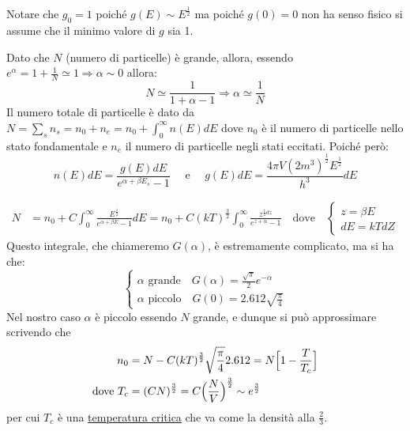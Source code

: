 Notare che $g_0 = 1$ poiché $g(E) \sim E^{ \frac{ 1}{2 }}$ ma poiché $g(0)=0$ non ha senso fisico si assume che il minimo valore di $g$ sia 1.

Dato che $N$ (numero di particelle) è grande, allora, essendo $e^{ \alpha } = 1 + \frac{ 1}{N }\simeq 1 \Rightarrow \alpha \sim 0$ allora:
$$ N \simeq \frac{ 1}{1 + \alpha - 1 } \Rightarrow \alpha \simeq \frac{ 1}{N }$$
Il numero totale di particelle è dato da $N = \sum_s n_s = n_0 + n_e = n_0 + \int_0^{\infty} n(E)dE$ dove $n_0$ è il numero di particelle nello stato fondamentale e $n_e$ il numero di particelle negli stati eccitati.
Poiché però:
\begin{equation}
n(E)dE = \frac{ g(E)dE}{e^{ \alpha + \beta E_s } - 1 } \quad \mbox{ e } \quad g(E) dE= \frac{ 4 \pi V (2m^3)^\frac{ 1}{2 } E^\frac{ 1}{2 } }{ h^3} dE
\end{equation}

\begin{equation}
\begin{split}
N & = n_0 + C \int_0^{\infty} \frac{ E^{ \frac{ 1}{2 } }}{e^{\alpha + \beta E } -1 }dE = n_0 + C (kT)^{ \frac{ 3}{2 } } \int_0^{\infty} \frac{ z^{\frac{ 1}{2 } dz}}{e^{z+\alpha } - 1} \quad
\mbox{dove} \quad
\begin{cases}
	z = \beta E \\
	dE = k T dZ
\end{cases}
\end{split}
\end{equation}
Questo integrale, che chiameremo $G(\alpha)$, è estremamente complicato, ma si ha che:
\begin{equation}
\begin{cases}
	\alpha \mbox{ grande} \quad G(\alpha) = \frac{ \sqrt{\pi}}{2 } e^{ - \alpha } \\
	\alpha \mbox{ piccolo} \quad G(0) = 2.612 \sqrt{\frac{ \pi}{4 }}
\end{cases}
\end{equation}
Nel nostro caso $\alpha$ è piccolo essendo $N$ grande, e dunque si può approssimare scrivendo che 
\begin{equation}
\begin{split}
	n_0 & = N - C (kT)^{ \frac{ 3}{2 } } \sqrt{\frac{ \pi}{4 }} 2.612 = N \Bigl[ 1 - \frac{ T}{T_c } \Bigr] \\
	\mbox{dove } T_c & = (CN)^{ \frac{ 3}{2 } }  = C \Bigl(  \frac{ N}{V }  \Bigr)^{ \frac{ 3}{2 } } \sim e^{ \frac{ 3}{2 } } 
\end{split}
\end{equation}
per cui $T_c$ è una \underline{temperatura critica} che va come la densità alla $\frac{ 2}{3 }$.

